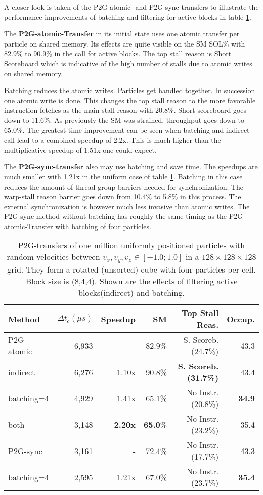 \documentclass[m,times]{cgMA}
\begin{document}
A closer look is taken of the P2G-atomic- and P2G-sync-transfers to illustrate the performance improvements of batching and filtering for active blocks in table \ref{table:p2g_optim}.

The \textbf{P2G-atomic-Transfer} in its initial state uses one atomic transfer per particle on shared memory. Its effects are quite visible on the SM SOL\% with 82.9\% to 90.9\% in the call for active blocks. The top stall reason is Short Scoreboard which is indicative of the high number of stalls due to atomic writes on shared memory.

Batching reduces the atomic writes. Particles get handled together. In succession one atomic write is done. This changes the top stall reason to the more favorable instruction fetches as the main stall reason with 20.8\%. Short scoreboard goes down to 11.6\%. As previously the SM was strained, throughput goes down to 65.0\%. The greatest time improvement can be seen when batching and indirect call lead to a combined speedup of 2.2x. This is much higher than the multiplicative speedup of 1.51x one could expect.

The \textbf{P2G-sync-transfer} also may use batching and save time. The speedups are much smaller with 1.21x in the uniform case of table \ref{table:p2g_optim}. Batching in this case reduces the amount of thread group barriers needed for synchronization. The warp-stall reason barrier goes down from 10.4\% to 5.8\% in this process. The external synchronization is however much less invasive than atomic writes. The P2G-sync method without batching has roughly the same timing as the P2G-atomic-Transfer with batching of four particles.
\begin{table}[htpb]
  \begin{tabular}{ | l | r | r | r | r | r |}    \hline
    Method                 &  $\Delta t_c(\mu s)$ & Speedup &SM    & Top Stall Reas.  & Occup.\\\hline
    P2G-atomic		   &    6,933             & -       &82.9\%&S. Scoreb.(24.7\%)& 43.3\\\hline
    indirect		   &    6,276             & 1.10x   &90.8\%&\textbf{S. Scoreb.(31.7\%)} & 43.4\\\hline
    batching=4           &    4,929             & 1.41x   &65.1\%&No Instr.(20.8\%)& \textbf{34.9}\\\hline
    both                   &    3,148             & \textbf{2.20x}   &\textbf{65.0}\%&No Instr.(23.2\%) & 35.4\\\hline
    \hline
    P2G-sync     &    3,161             & -       &72.4\%&No Instr.(17.7\%) & 43.3\\\hline
    batching=4             &    2,595             & 1.21x   &67.0\%&No Instr.(23.7\%) & \textbf{35.4}\\\hline
 \end{tabular}
 \caption{P2G-transfers of one million uniformly positioned particles with random velocities between $v_x,v_y,v_z \in [-1.0;1.0]$ in a $128\times 128\times128$ grid. They form a rotated (unsorted) cube with four particles per cell. Block size is (8,4,4). Shown are the effects of filtering active blocks(indirect) and batching.}\label{table:p2g_optim}
\end{table}
\end{document}
